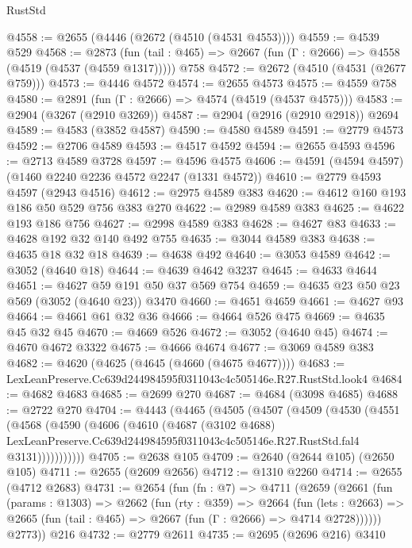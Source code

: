 \begin{lexlean}{RustStd}
\begin{coremodule}
@4558 := @2655 (@4446 (@2672 (@4510 (@4531 @4553))))
@4559 := @4539 @529
@4568 := @2873
    (fun (tail : @465) => @2667 (fun (Γ : @2666) => @4558 (@4519 (@4537 (@4559 @1317)))))
    @758
@4572 := @2672 (@4510 (@4531 (@2677 @759)))
@4573 := @4446 @4572
@4574 := @2655 @4573
@4575 := @4559 @758
@4580 := @2891 (fun (Γ : @2666) => @4574 (@4519 (@4537 @4575)))
@4583 := @2904 (@3267 (@2910 @3269))
@4587 := @2904 (@2916 (@2910 @2918)) @2694
@4589 := @4583 (@3852 @4587)
@4590 := @4580 @4589
@4591 := @2779 @4573
@4592 := @2706 @4589
@4593 := @4517 @4592
@4594 := @2655 @4593
@4596 := @2713 @4589 @3728
@4597 := @4596 @4575
@4606 := @4591 (@4594 @4597) (@1460 @2240 @2236 @4572 @2247 (@1331 @4572))
@4610 := @2779 @4593 @4597 (@2943 @4516)
@4612 := @2975 @4589 @383
@4620 := @4612 @160 @193 @186 @50 @529 @756 @383 @270
@4622 := @2989 @4589 @383
@4625 := @4622 @193 @186 @756
@4627 := @2998 @4589 @383
@4628 := @4627 @83
@4633 := @4628 @192 @32 @140 @492 @755
@4635 := @3044 @4589 @383
@4638 := @4635 @18 @32 @18
@4639 := @4638 @492
@4640 := @3053 @4589
@4642 := @3052 (@4640 @18)
@4644 := @4639 @4642 @3237
@4645 := @4633 @4644
@4651 := @4627 @59 @191 @50 @37 @569 @754
@4659 := @4635 @23 @50 @23 @569 (@3052 (@4640 @23)) @3470
@4660 := @4651 @4659
@4661 := @4627 @93
@4664 := @4661 @61 @32 @36
@4666 := @4664 @526 @475
@4669 := @4635 @45 @32 @45
@4670 := @4669 @526
@4672 := @3052 (@4640 @45)
@4674 := @4670 @4672 @3322
@4675 := @4666 @4674
@4677 := @3069 @4589 @383
@4682 := @4620 (@4625 (@4645 (@4660 (@4675 @4677))))
@4683 := LexLeanPreserve.Cc639d244984595f0311043c4c505146e.R27.RustStd.look4
@4684 := @4682 @4683
@4685 := @2699 @270
@4687 := @4684 (@3098 @4685)
@4688 := @2722 @270
@4704 := @4443
    (@4465
      (@4505
        (@4507
          (@4509
            (@4530
              (@4551
                (@4568
                  (@4590
                    (@4606
                      (@4610
                        (@4687
                          (@3102 @4688)
                          LexLeanPreserve.Cc639d244984595f0311043c4c505146e.R27.RustStd.fal4
                          @3131)))))))))))
@4705 := @2638 @105
@4709 := @2640 (@2644 @105) (@2650 @105)
@4711 := @2655 (@2609 @2656)
@4712 := @1310 @2260
@4714 := @2655 (@4712 @2683)
@4731 := @2654
    (fun (fn : @7) =>
    @4711
      (@2659
        (@2661
          (fun (params : @1303) =>
          @2662
            (fun (rty : @359) =>
            @2664
              (fun (lets : @2663) =>
              @2665 (fun (tail : @465) => @2667 (fun (Γ : @2666) => @4714 @2728))))))
        @2773))
    @216
@4732 := @2779 @2611
@4735 := @2695 (@2696 @216) @3410

\end{coremodule}
\end{lexlean}
